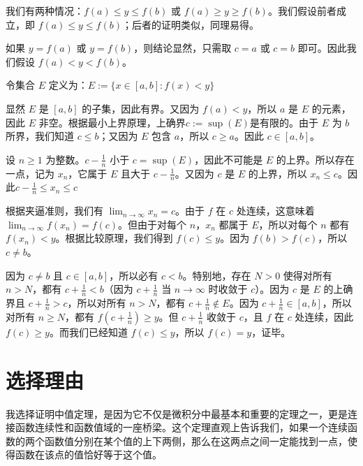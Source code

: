 \documentclass[a4paper]{article}
\begin{document}
我们有两种情况：\(f(a) \leq y \leq f(b)\) 或 \(f(a) \geq y \geq f(b)\)。我们假设前者成立，即 \(f(a) \leq y \leq f(b)\)；后者的证明类似，同理易得。

如果 \(y = f(a)\) 或 \(y = f(b)\)，则结论显然，只需取 \(c = a\) 或 \(c = b\) 即可。因此我们假设 \(f(a) < y < f(b)\)。

令集合 \(E\) 定义为：\(E := \{x \in [a,b] : f(x) < y\}\)

显然 \(E\) 是 \([a,b]\) 的子集，因此有界。又因为 \(f(a) < y\)，所以 \(a\) 是 \(E\) 的元素，因此 \(E\) 非空。根据最小上界原理，上确界\(c := \sup(E)\)是有限的。由于 \(E\) 为 \(b\) 所界，我们知道 \(c \leq b\)；又因为 \(E\) 包含 \(a\)，所以 \(c \geq a\)。因此 \(c \in [a,b]\)。

设 \(n \geq 1\) 为整数。\(c - \frac{1}{n}\) 小于 \(c = \sup(E)\)，因此不可能是 \(E\) 的上界。所以存在一点，记为 \(x_n\)，它属于 \(E\) 且大于 \(c - \frac{1}{n}\)。又因为 \(c\) 是 \(E\) 的上界，所以 \(x_n \leq c\)。因此\(c - \frac{1}{n} \leq x_n \leq c\)

根据夹逼准则，我们有 \(\lim_{n \to \infty} x_n = c\)。由于 \(f\) 在 \(c\) 处连续，这意味着 \(\lim_{n \to \infty} f(x_n) = f(c)\)。但由于对每个 \(n\)，\(x_n\) 都属于 \(E\)，所以对每个 \(n\) 都有 \(f(x_n) < y\)。根据比较原理，我们得到 \(f(c) \leq y\)。因为 \(f(b) > f(c)\)，所以 \(c \neq b\)。

因为 \(c \neq b\) 且 \(c \in [a,b]\)，所以必有 \(c < b\)。特别地，存在 \(N > 0\) 使得对所有 \(n > N\)，都有 \(c + \frac{1}{n} < b\)（因为 \(c + \frac{1}{n}\) 当 \(n \to \infty\) 时收敛于 \(c\)）。因为 \(c\) 是 \(E\) 的上确界且 \(c + \frac{1}{n} > c\)，所以对所有 \(n > N\)，都有 \(c + \frac{1}{n} \notin E\)。因为 \(c + \frac{1}{n} \in [a,b]\)，所以对所有 \(n \geq N\)，都有 \(f(c + \frac{1}{n}) \geq y\)。但 \(c + \frac{1}{n}\) 收敛于 \(c\)，且 \(f\) 在 \(c\) 处连续，因此 \(f(c) \geq y\)。而我们已经知道 \(f(c) \leq y\)，所以 \(f(c) = y\)，证毕。

\section{选择理由}

我选择证明中值定理，是因为它不仅是微积分中最基本和重要的定理之一，更是连接函数连续性和函数值域的一座桥梁。这个定理直观上告诉我们，如果一个连续函数的两个函数值分别在某个值的上下两侧，那么在这两点之间一定能找到一点，使得函数在该点的值恰好等于这个值。
\end{document}
